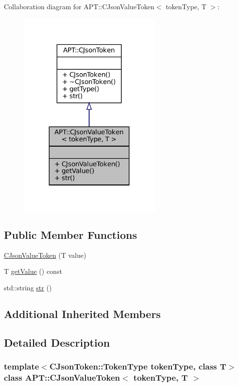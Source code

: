 Collaboration diagram for A\+PT\+:\+:C\+Json\+Value\+Token$<$ token\+Type, T $>$\+:
\nopagebreak
\begin{figure}[H]
\begin{center}
\leavevmode
\includegraphics[width=203pt]{classAPT_1_1CJsonValueToken__coll__graph}
\end{center}
\end{figure}
\subsection*{Public Member Functions}
\begin{DoxyCompactItemize}
\item 
\hyperlink{classAPT_1_1CJsonValueToken_a8c037f13ded3735b427a5d2738208df8}{C\+Json\+Value\+Token} (T value)
\item 
T \hyperlink{classAPT_1_1CJsonValueToken_a352489d038676e08aba9f8b06f932c88}{get\+Value} () const
\item 
std\+::string \hyperlink{classAPT_1_1CJsonValueToken_ab7d49b06f5242abfb7e67fa10278690b}{str} ()
\end{DoxyCompactItemize}
\subsection*{Additional Inherited Members}


\subsection{Detailed Description}
\subsubsection*{template$<$C\+Json\+Token\+::\+Token\+Type token\+Type, class T$>$\newline
class A\+P\+T\+::\+C\+Json\+Value\+Token$<$ token\+Type, T $>$}

